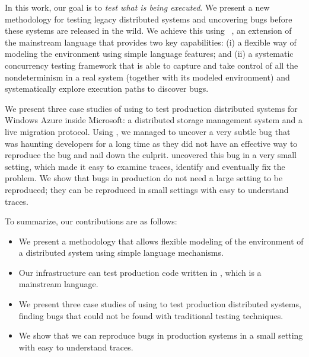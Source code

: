 In this work, our goal is to \emph{test what is being executed}. We present a new methodology for testing legacy distributed systems and uncovering bugs before these systems are released in the wild. We achieve this using \psharp~\cite{deligiannis2015psharp}, an extension of the mainstream language \csharp that provides two key capabilities: (i) a flexible way of modeling the environment using simple language features; and (ii) a systematic concurrency testing framework that is able to capture and take control of all the nondeterminism in a real system (together with its modeled environment) and systematically explore execution paths to discover bugs.

We present three case studies of using \psharp to test production distributed systems for Windows Azure inside Microsoft: a distributed storage management system and a live migration protocol. Using \psharp, we managed to uncover a very subtle bug that was haunting developers for a long time as they did not have an effective way to reproduce the bug and nail down the culprit. \psharp uncovered this bug in a very small setting, which made it easy to examine traces, identify and eventually fix the problem. We show that bugs in production do not need a large setting to be reproduced; they can be reproduced in small settings with easy to understand traces.

To summarize, our contributions are as follows:

\begin{itemize}
\item We present a methodology that allows flexible modeling of the environment of a distributed system using simple language mechanisms.
\item Our infrastructure can test production code written in \csharp, which is a mainstream language.
\item We present three case studies of using \psharp to test production distributed systems, finding bugs that could not be found with traditional testing techniques.
\item We show that we can reproduce bugs in production systems in a small setting with easy to understand traces.
\end{itemize}
